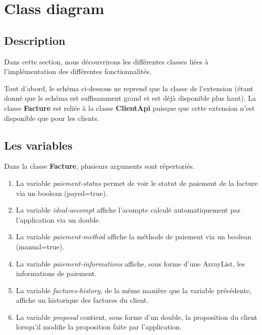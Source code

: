 \section{Class diagram}
\subsection{Description}
\begin{flushleft}
Dans cette section, nous découvrirons les différentes classes liées à l'implémentation des différentes fonctionnalités.
\end{flushleft}

\begin{flushleft}
Tout d'abord, le schéma ci-dessous ne reprend que la classe de l'extension (étant donné que le schéma est suffisamment grand et est déjà disponible plus haut). La classe \textbf{Facture} est reliée à la classe \textbf{ClientApi} puisque que cette extension n'est disponible que pour les clients.
\end{flushleft}

\subsection{Les variables}
\begin{flushleft}
Dans la classe \textbf{Facture}, plusieurs arguments sont répertoriés.
\end{flushleft}

\begin{enumerate}[-]

\item La variable \emph{paiement-status} permet de voir le statut de paiement de la facture via un boolean (payed=true).

\item La variable \emph{ideal-accompt} affiche l'acompte calculé automatiquement par l'application via un double.

\item La variable \emph{paiement-method} affiche la méthode de paiement via un boolean (manual=true).

\item La variable \emph{paiement-informations} affiche, sous forme d'une ArrayList, les informations de paiement.

\item La variable \emph{factures-history}, de la même manière que la variable précédente, affiche un historique des factures du client.

\item La variable \emph{proposal} contient, sous forme d'un double, la proposition du client lorsqu'il modifie la proposition faite par l'application.

\end{enumerate}

